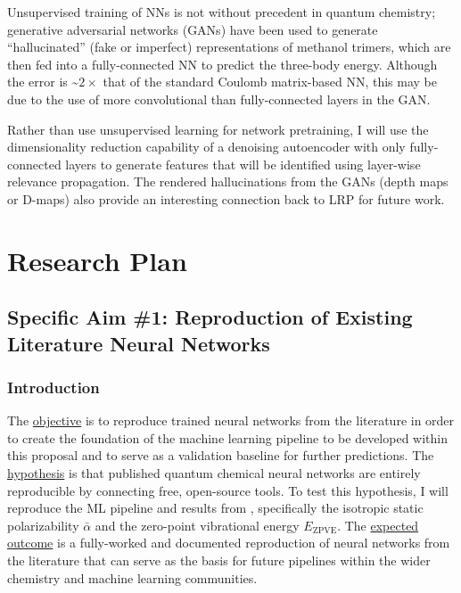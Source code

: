 \documentclass[12pt]{article}
\begin{document}
Unsupervised training of NNs is not without precedent in quantum chemistry; generative adversarial networks (GANs) have been used to generate ``hallucinated'' (fake or imperfect) representations of methanol trimers, which are then fed into a fully-connected NN to predict the three-body energy\cite{doi:10.1063/1.4973380}. Although the error is \textasciitilde{}\(2\times\) that of the standard Coulomb matrix-based NN, this may be due to the use of more convolutional than fully-connected layers in the GAN.

Rather than use unsupervised learning for network pretraining, I will use the dimensionality reduction capability of a denoising autoencoder\cite{VincentPLarochelleH2008} with only fully-connected layers to generate features that will be identified using layer-wise relevance propagation. The rendered hallucinations from the GANs (depth maps or D-maps) also provide an interesting connection back to LRP for future work.

\section{Research Plan}
\label{sec:orgc5a0787}

\subsection{Specific Aim \#1: Reproduction of Existing Literature Neural Networks}
\label{sec:orged1ed8b}

\subsubsection{Introduction}
\label{sec:org39e3d71}

The \uline{objective} is to reproduce trained neural networks from the literature in order to create the foundation of the machine learning pipeline to be developed within this proposal and to serve as a validation baseline for further predictions. The \uline{hypothesis} is that published quantum chemical neural networks are entirely reproducible by connecting free, open-source tools. To test this hypothesis, I will reproduce the ML pipeline and results from \parencite{2017arXiv170205532F}, specifically the isotropic static polarizability \(\bar{\alpha}\) and the zero-point vibrational energy \(E_{\text{ZPVE}}\). The \uline{expected outcome} is a fully-worked and documented reproduction of neural networks from the literature that can serve as the basis for future pipelines within the wider chemistry and machine learning communities.
\end{document}
